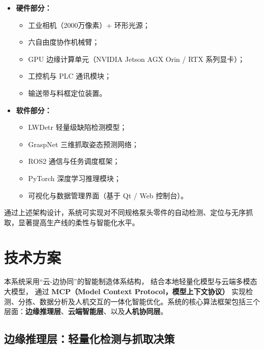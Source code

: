 \documentclass{cumcmthesis}
\begin{document}
\begin{itemize}
    \item \textbf{硬件部分：}
    \begin{itemize}
        \item 工业相机（2000万像素）+ 环形光源；
        \item 六自由度协作机械臂；
        \item GPU 边缘计算单元（NVIDIA Jetson AGX Orin / RTX 系列显卡）；
        \item 工控机与 PLC 通讯模块；
        \item 输送带与料框定位装置。
    \end{itemize}

    \item \textbf{软件部分：}
    \begin{itemize}
        \item LWDetr 轻量级缺陷检测模型；
        \item GraspNet 三维抓取姿态预测网络；
        \item ROS2 通信与任务调度框架；
        \item PyTorch 深度学习推理模块；
        \item 可视化与数据管理界面（基于 Qt / Web 控制台）。
    \end{itemize}
\end{itemize}

通过上述架构设计，系统可实现对不同规格泵头零件的自动检测、定位与无序抓取，显著提高生产线的柔性与智能化水平。


\section{技术方案}

本系统采用“云-边协同”的智能制造体系结构，
结合本地轻量化模型与云端多模态大模型，
通过 \textbf{MCP（Model Context Protocol，模型上下文协议）} 实现检测、分拣、数据分析及人机交互的一体化智能优化。系统的核心算法框架包括三个层面：\textbf{边缘推理层}、\textbf{云端智能层}、以及\textbf{人机协同层}。

\subsection{边缘推理层：轻量化检测与抓取决策}
\end{document}
